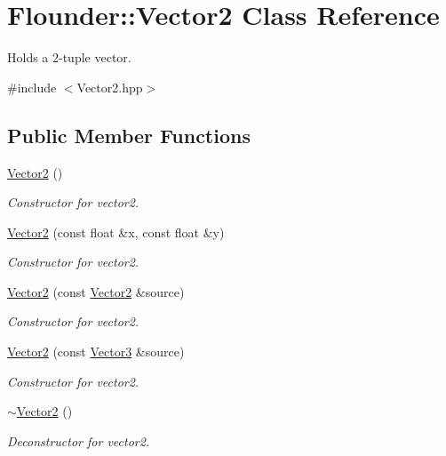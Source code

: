 \hypertarget{class_flounder_1_1_vector2}{}\section{Flounder\+:\+:Vector2 Class Reference}
\label{class_flounder_1_1_vector2}


Holds a 2-\/tuple vector.  




{\ttfamily \#include $<$Vector2.\+hpp$>$}

\subsection*{Public Member Functions}
\begin{DoxyCompactItemize}
\item 
\hyperlink{class_flounder_1_1_vector2_a1134bd3edafd519821915ec156746d2b}{Vector2} ()
\begin{DoxyCompactList}\small\item\em Constructor for vector2. \end{DoxyCompactList}\item 
\hyperlink{class_flounder_1_1_vector2_a0fa49fc940bdbcf5fb232bdaf2649cc4}{Vector2} (const float \&x, const float \&y)
\begin{DoxyCompactList}\small\item\em Constructor for vector2. \end{DoxyCompactList}\item 
\hyperlink{class_flounder_1_1_vector2_a93de8b6b7ca4a3425bd48ba35a812390}{Vector2} (const \hyperlink{class_flounder_1_1_vector2}{Vector2} \&source)
\begin{DoxyCompactList}\small\item\em Constructor for vector2. \end{DoxyCompactList}\item 
\hyperlink{class_flounder_1_1_vector2_aa165ee95f958a45c9d8a6cfb9143b047}{Vector2} (const \hyperlink{class_flounder_1_1_vector3}{Vector3} \&source)
\begin{DoxyCompactList}\small\item\em Constructor for vector2. \end{DoxyCompactList}\item 
\hyperlink{class_flounder_1_1_vector2_ae515d367363f696544278f2e8d77819a}{$\sim$\+Vector2} ()
\begin{DoxyCompactList}\small\item\em Deconstructor for vector2. \end{DoxyCompactList}\item 

\end{DoxyCompactItemize}

